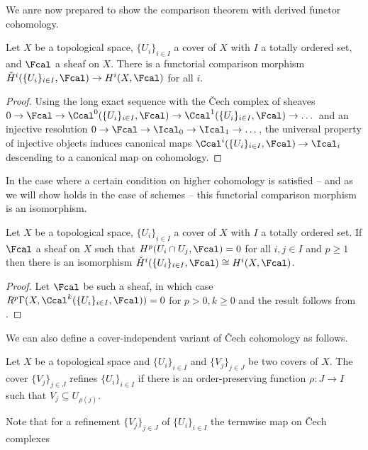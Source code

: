 We anre now prepared to show the comparison theorem with derived functor cohomology. 
\begin{theorem}\label{thm: Cech to derived functor comparison}
    Let $X$ be a topological space, $\{U_{i}\}_{i\in I}$ a cover of $X$ with $I$ a totally ordered set, and $\Fcal$ a sheaf on $X$. There is a functorial comparison morphism $\check{H}^{i}(\{U_{i}\}_{i\in I},\Fcal)\to H^{i}(X,\Fcal)$ for all $i$. 
\end{theorem}
\begin{proof}
    Using the long exact sequence with the \v{C}ech complex of sheaves $0\to\Fcal\to\Ccal^{0}(\{U_{i}\}_{i\in I},\Fcal)\to\Ccal^{1}(\{U_{i}\}_{i\in I},\Fcal)\to\dots$ and an injective resolution $0\to\Fcal\to\Ical_{0}\to\Ical_{1}\to\dots$, the universal property of injective objects induces canonical maps $\Ccal^{i}(\{U_{i}\}_{i\in I},\Fcal)\to\Ical_{i}$ descending to a canonical map on cohomology. 
\end{proof}
In the case where a certain condition on higher cohomology is satisfied -- and as we will show holds in the case of schemes -- this functorial comparison morphism is an isomorphism. 
\begin{proposition}\label{prop: comparison between Cech and derived functor cohomology is an isomorphism}
    Let $X$ be a topological space, $\{U_{i}\}_{i\in I}$ a cover of $X$ with $I$ a totally ordered set. If $\Fcal$ a sheaf on $X$ such that $H^{p}(U_{i}\cap U_{j},\Fcal)=0$ for all $i,j\in I$ and $p\geq 1$ then there is an isomorphism $\check{H}^{i}(\{U_{i}\}_{i\in I},\Fcal)\cong H^{i}(X,\Fcal)$.
\end{proposition}
\begin{proof}
    Let $\Fcal$ be such a sheaf, in which case $R^{p}\Gamma(X,\Ccal^{k}(\{U_{i}\}_{i\in I},\Fcal))=0$ for $p>0, k\geq0$ and the result follows from . 
\end{proof}
We can also define a cover-independent variant of \v{C}ech cohomology as follows. 
\begin{definition}\label{def: refinement of cover}
    Let $X$ be a topological space and $\{U_{i}\}_{i\in I}$ and $\{V_{j}\}_{j\in J}$ be two covers of $X$. The cover $\{V_{j}\}_{j\in J}$ refines $\{U_{i}\}_{i\in I}$ if there is an order-preserving function $\rho:J\to I$ such that $V_{j}\subseteq U_{\rho(j)}$. 
\end{definition}
Note that for a refinement $\{V_{j}\}_{j\in J}$ of $\{U_{i}\}_{i\in I}$ the termwise map on \v{C}ech complexes 
